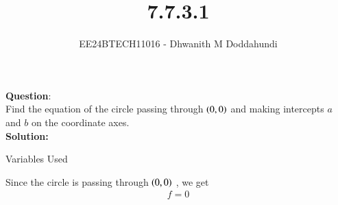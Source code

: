 \documentclass[journal]{IEEEtran}
\begin{document}

\vspace{3cm}

\title{7.7.3.1}
\author{EE24BTECH11016 - Dhwanith M Doddahundi
}
{\let\newpage\relax\maketitle}

\renewcommand{\thefigure}{\theenumi}
\renewcommand{\thetable}{\theenumi}
\setlength{\intextsep}{10pt} %


\renewcommand{\thetable}{\theenumi}


\textbf{Question}:\\
Find the equation of the circle passing through $\left(0, 0\right)$ and making intercepts $a$ and $b$
on the coordinate axes.
\\
\textbf{Solution: }
\begin{table}[h!]    
  \centering
  
  \caption{Variables Used}
  \label{tab10.5.3.9.1}
\end{table}


  Since the circle is passing through $\left(0,0\right)$ , we get 
\begin{align}
    f=0
\end{align}
\end{document}
